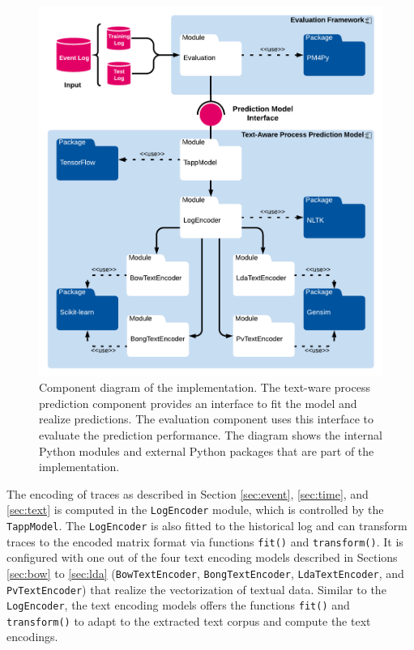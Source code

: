 \begin{figure}[htbp!]
	\centering
	\includegraphics[width=\textwidth]{figures/implementation}
	\caption[Component diagram of the implementation]{Component diagram of the implementation. The text-ware process prediction component provides an interface to fit the model and realize predictions. The evaluation component uses this interface to evaluate the prediction performance. The diagram shows the internal Python modules and external Python packages that are part of the implementation.}
	\label{fig:/implementation}
\end{figure}

The encoding of traces as described in Section \ref{sec:event}, \ref{sec:time}, and \ref{sec:text} is computed in the \texttt{LogEncoder} module, which is controlled by the \texttt{TappModel}.
The \texttt{LogEncoder} is also fitted to the historical log and can transform traces to the encoded matrix format via functions \texttt{fit()} and \texttt{transform()}.
It is configured with one out of the four text encoding models described in Sections \ref{sec:bow} to \ref{sec:lda} (\texttt{BowTextEncoder},  \texttt{BongTextEncoder}, \texttt{LdaTextEncoder}, and \texttt{PvTextEncoder}) that realize the vectorization of textual data.
Similar to the \texttt{LogEncoder}, the text encoding models offers the functions \texttt{fit()} and \texttt{transform()} to adapt to the extracted text corpus and compute the text encodings.


